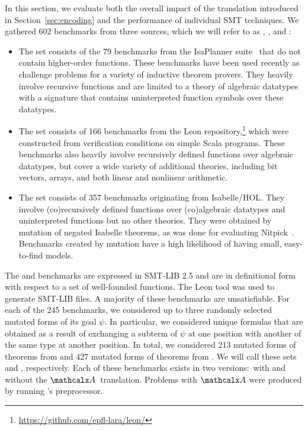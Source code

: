 In this section, we evaluate both the overall impact of the translation
introduced in Section~\ref{sec:encoding} and the performance of individual SMT
techniques.
%
We gathered 602 benchmarks from three sources, which we will refer to as
\ip, \leon, and \isanun:
\begin{itemize}
\item
The \ip{} set consists of the 79 benchmarks from the IsaPlanner
suite~\cite{DBLP:conf/itp/JohanssonDB10} that do not contain higher-order
functions. These benchmarks have been used recently as challenge problems for a
variety of inductive theorem provers. They heavily involve
recursive functions and are limited to a theory of algebraic datatypes
with a signature that contains uninterpreted function symbols over these datatypes.

\smallskip

\item
The \leon{} set consists of 166
benchmarks from the Leon repository,\footnote{%
\url{https://github.com/epfl-lara/leon/}} which were constructed from
verification conditions on simple Scala programs. These benchmarks also
heavily involve recursively defined functions over algebraic datatypes,
but cover a wide variety of additional theories, including bit vectors, arrays, and
both linear and nonlinear arithmetic.

\smallskip

\item
The \isanun{} set consists of 357 benchmarks originating from Isabelle/HOL. They
involve (co)recursively defined functions over (co)algebraic datatypes and
uninterpreted functions but no other theories. They were obtained by mutation
of negated Isabelle theorems, as was done for evaluating
Nitpick~\cite{blanchette-nipkow-2010}. 
Benchmarks created by mutation have a high likelihood of having small, easy-to-find models.
\end{itemize}

The \ip{} and \leon{} benchmarks are expressed in SMT-LIB 2.5 and are in
definitional form with respect to a set of well-founded functions.
The Leon tool was used to generate SMT-LIB files.
A majority of these benchmarks are unsatisfiable.
For each of the 245 benchmarks,
we considered up to three randomly selected
mutated forms of its goal $\psi$. In particular, we considered unique
formulas that are obtained as a result of exchanging a subterm of $\psi$ at
one position with another of the same type at another position.
In total, we considered 213 mutated forms of
theorems from \ip and 427 mutated forms of theorems from \leon. We will
call these sets \ipm and \leonm, respectively. Each of these benchmarks exists
in two versions:\ with and without the $\conv$~translation. Problems with
$\conv$ were produced by running \cvc's preprocessor. %


